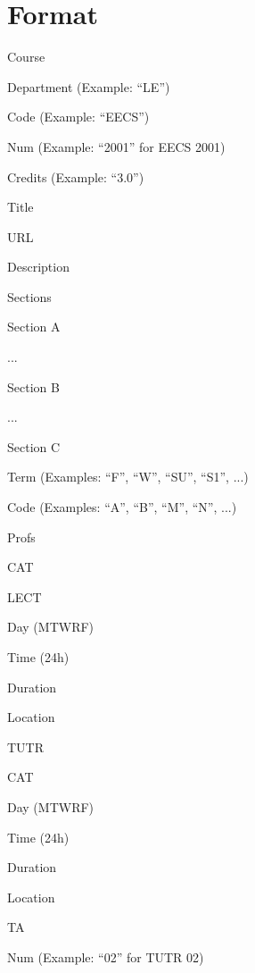 \section{Format}
\noindent Course
\begin{itemize*}
	\item Department (Example: ``LE'')
	\item Code (Example: ``EECS'')
	\item Num (Example: ``2001'' for EECS 2001)
	\item Credits (Example: ``3.0'')
	\item Title
	\item URL
	\item Description
	\item Sections
	\begin{itemize*}
		\item Section A
		\begin{itemize*}
			\item ...
		\end{itemize*}
		\item Section B
		\begin{itemize*}
			\item ...
		\end{itemize*}
		\item Section C
		\begin{itemize*}
			\item Term (Examples: ``F'', ``W'', ``SU'', ``S1'', ...)
			\item Code (Examples: ``A'', ``B'', ``M'', ``N'', ...)
			\item Profs
			\item CAT
			\item LECT
			\begin{itemize*}
				\item Day (MTWRF)
				\item Time (24h)
				\item Duration
				\item Location
			\end{itemize*}
			\item TUTR
			\begin{itemize*}
				\item CAT
				\item Day (MTWRF)
				\item Time (24h)
				\item Duration
				\item Location
				\item TA
				\item Num (Example: ``02'' for TUTR 02)

\end{itemize*}
\end{itemize*}
\end{itemize*}
\end{itemize*}
